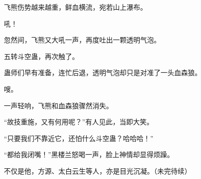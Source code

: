 \begin{this_body}
飞熊伤势越来越重，鲜血横流，宛若山上瀑布。

吼！

忽然间，飞熊又大吼一声，再度吐出一颗透明气泡。

五转斗空蛊，再次触了。

蛊师们早有准备，连忙后退，透明气泡却只是对准了一头血森狼。

嗖。

一声轻响，飞熊和血森狼骤然消失。

“故技重施，又有何用呢？”有人见此，当即大笑。

“只要我们不靠近它，还怕什么斗空蛊？哈哈哈！”

“都给我闭嘴！”黑楼兰怒喝一声，脸上神情却显得烦躁。

不仅是他，方源、太白云生等人，亦是目光沉凝。（未完待续）

\end{this_body}


